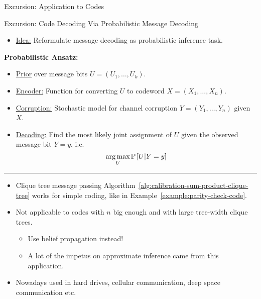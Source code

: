 \begin{frame}{Excursion: Application to Codes}
\begin{example}
\begin{minipage}{0.49\textwidth}
\begin{center}
        \end{center}
            \end{minipage}
        \end{example}
    \end{frame}
    
    \begin{frame}{Excursion: Code Decoding Via Probabilistic Message Decoding}
        \begin{itemize}
            \pause \item \underline{Idea:} Reformulate message decoding as probabilistic inference task.
        \end{itemize}
        \textbf{Probabilistic Ansatz:}
        \begin{itemize}
            \item \underline{Prior} over message bits $U = (U_1,\ldots,U_k)$.
            \pause \item \underline{Encoder:} Function for converting $U$ to codeword $X = (X_1,\ldots,X_n)$.
            \pause \item \underline{Corruption:} Stochastic model for channel corruption $Y = (Y_1,\ldots,Y_n)$ given $X$.
            \pause \item \underline{Decoding:}  Find the most likely joint assignment of $U$ given the observed message bit $Y = y$, i.e.\ 
            \begin{equation}
                \argmax_{U} \Pb[U | Y = y]
            \end{equation}
        \end{itemize}
        \pause
        \hrule
        \begin{itemize}
            \item Clique tree message passing Algorithm~\ref{alg:calibration-sum-product-clique-tree} works for simple coding, like in Example~\ref{example:parity-check-code}.
            \pause \item Not applicable to codes with $n$ big enough and with large tree-width clique trees.
            \begin{itemize}
                \pause \item Use belief propagation instead!
                \pause \item A lot of the impetus on approximate inference came from this application.
            \end{itemize}
            \pause \item Nowadays used in hard drives, cellular communication, deep space communication etc.
        \end{itemize}
    \end{frame}